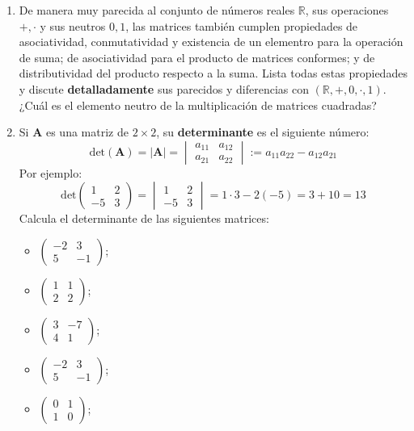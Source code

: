 \documentclass[8pt,a4paper]{article}
\begin{document}
\begin{enumerate}
		\item De manera muy parecida al conjunto de números reales $\mathbb{R}$, sus operaciones $+,\cdot$ y sus neutros $0,1$, las matrices también cumplen propiedades de asociatividad, conmutatividad y existencia de un elementro para la operación de suma; de asociatividad para el producto de matrices conformes; y de distributividad del producto respecto a la suma. Lista todas estas propiedades y discute \textbf{detalladamente} sus parecidos y diferencias con $\left(\mathbb{R},+,0,\cdot,1\right)$. ¿Cuál es el elemento neutro de la multiplicación de matrices cuadradas?

		\item Si $\mathbf{A}$ es una matriz de $2\times 2$, su \textbf{determinante} es el siguiente número:
%
	\[\mathrm{det}\left(\mathbf{A}\right)=\left|\mathbf{A}\right|=
		\begin{vmatrix} a_{11} & a_{12} \\ a_{21} & a_{22} \end{vmatrix}
		:=a_{11}a_{22}-a_{12}a_{21}
	\]
%
Por ejemplo:
%
	\[\mathrm{det}\begin{pmatrix} 1 & 2 \\ -5 & 3 \end{pmatrix}=
	\begin{vmatrix} 1 & 2 \\ -5 & 3 \end{vmatrix}=1\cdot 3 - 2(-5)=3+10=13
	\]
%
Calcula el determinante de las siguientes matrices:
	\begin{multicols}{3}
		\begin{itemize}
			\item $\displaystyle \begin{pmatrix} -2 & 3 \\ 5 & -1 \end{pmatrix}$;
			\item $\displaystyle \begin{pmatrix} 1 & 1 \\ 2 & 2 \end{pmatrix}$;
			\item $\displaystyle \begin{pmatrix} 3 & -7 \\ 4 & 1 \end{pmatrix}$;
			\item $\displaystyle \begin{pmatrix} -2 & 3 \\ 5 & -1 \end{pmatrix}$;
			\item $\displaystyle \begin{pmatrix} 0 & 1 \\ 1 & 0 \end{pmatrix}$;

\end{itemize}
\end{multicols}
\end{enumerate}
\end{document}
